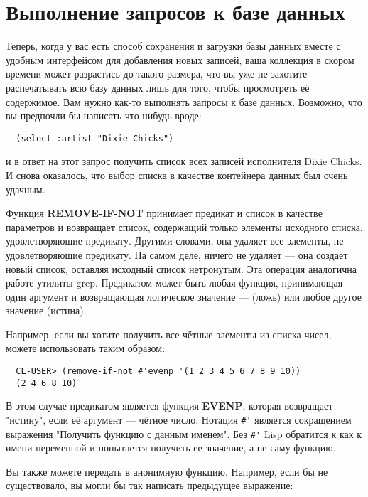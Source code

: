 \section{Выполнение запросов к базе данных}

Теперь, когда у вас есть способ сохранения и загрузки базы данных вместе с удобным
интерфейсом для добавления новых записей, ваша коллекция в скором времени может разрастись
до такого размера, что вы уже не захотите распечатывать всю базу данных лишь для того,
чтобы просмотреть её содержимое. Вам нужно как-то выполнять запросы к базе
данных. Возможно, что вы предпочли бы написать что-нибудь вроде:

\begin{verbatim}
  (select :artist "Dixie Chicks")
\end{verbatim}

и в ответ на этот запрос получить список всех записей исполнителя Dixie Chicks. И снова
оказалось, что выбор списка в качестве контейнера данных был очень удачным.

Функция \textbf{REMOVE-IF-NOT} принимает предикат и список в качестве параметров и
возвращает список, содержащий только элементы исходного списка, удовлетворяющие
предикату. Другими словами, она удаляет все элементы, не удовлетворяющие предикату. На
самом деле,  ничего не удаляет --- она создает новый список, оставляя
исходный список нетронутым. Эта операция аналогична работе утилиты grep. Предикатом может
быть любая функция, принимающая один аргумент и возвращающая логическое значение ---
 (ложь) или любое другое значение (истина).

Например, если вы хотите получить все чётные элементы из списка чисел, можете использовать
 таким образом:

\begin{verbatim}
  CL-USER> (remove-if-not #'evenp '(1 2 3 4 5 6 7 8 9 10))
  (2 4 6 8 10)
\end{verbatim}

В этом случае предикатом является функция \textbf{EVENP}, которая возвращает "истину",
если её аргумент --- чётное число. Нотация \lstinline!#'! является сокращением выражения
"Получить функцию с данным именем". Без \lstinline!#'! Lisp обратится к  как к
имени переменной и попытается получить ее значение, а не саму функцию.

Вы также можете передать в  анонимную функцию. Например, если бы
 не существовало, вы могли бы так написать предыдущее выражение:

